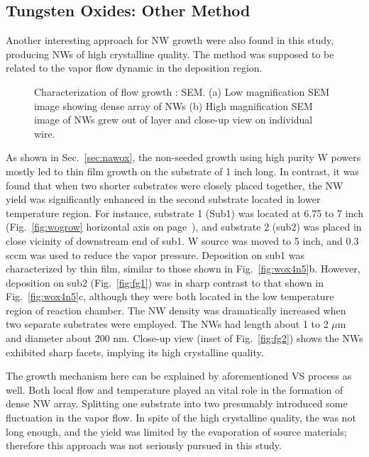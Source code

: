 \subsection{Tungsten Oxides: Other Method}

Another interesting approach for  NW growth were also found in this study, producing  NWs of high crystalline quality. The method was supposed to be related to the vapor flow dynamic in the deposition region. 
\begin{figure}[htb]
\centering
{}\hspace{0.04\textwidth}
\caption[Characterization of flow growth : SEM]{Characterization of flow growth : SEM. (a) Low magnification SEM image showing dense array of NWs (b) High magnification SEM image of NWs grew out of layer and close-up view on individual wire.}
\label{fig:wogrowsf}
\end{figure}
As shown in Sec.~\ref{sec:nawox}, the non-seeded growth using high purity W powers mostly led to thin film growth on the substrate of 1 inch long. In contrast, it was found that when two shorter substrates were closely placed together, the  NW yield was significantly enhanced in the second substrate located in lower temperature region. For instance, substrate 1 (Sub1) was located at 6.75 to 7 inch (Fig.~\ref{fig:wogrow} horizontal axis on page~\pageref{fig:wogrow}), and substrate 2 (sub2) was placed in close vicinity of downstream end of sub1. W source was moved to 5 inch, and 0.3 sccm  was used to reduce the  vapor pressure. Deposition on sub1 was characterized by thin film, similar to those shown in Fig.~\ref{fig:wox4n5}b. However, deposition on sub2 (Fig.~\ref{fig:fg1}) was in sharp contrast to that shown in Fig.~\ref{fig:wox4n5}c, although they were both located in the low temperature region of reaction chamber. The NW density was dramatically increased when two separate substrates were employed. The NWs had length about 1 to 2 $\mu$m and diameter about 200 nm. Close-up view (inset of Fig.~\ref{fig:fg2}) shows the NWs exhibited sharp facets, implying its high crystalline quality.

The growth mechanism here can be explained by aforementioned VS process as well. Both local flow and temperature played an vital role in the formation of dense NW array. Splitting one substrate into two presumably introduced some fluctuation in the vapor flow. In spite of the high crystalline quality, the  was not long enough, and the yield was limited by the evaporation of source materials; therefore this approach was not seriously pursued in this study. 


